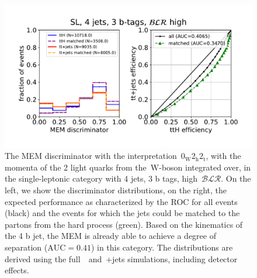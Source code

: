\begin{figure}
\begin{centering}
\includegraphics[width = 1.0\textwidth]{figures/mem_sl_j4_t3_blrH.pdf}
\caption{The MEM discriminator with the interpretation~$0_{\mathrm{W}} 2_{\mathrm{h}} 2_{\mathrm{t}}$, with the momenta of the 2 light quarks from the~$\mathrm{W}$-boson integrated over, in the single-leptonic category with 4 jets, 3 b tags, high~$\mathcal{BLR}$. On the left, we show the discriminator distributions, on the right, the expected performance as characterized by the ROC for all events (black) and the events for which the jets could be matched to the partons from the hard process (green). Based on the kinematics of the 4 b jet, the MEM is already able to achieve a degree of separation ($\mathrm{AUC} = 0.41$) in this category. The distributions are derived using the full~\ttHbb~and~\ttbar+jets simulations, including detector effects.}
\label{fig:mem_sl_j4_t3}
\end{centering}
\end{figure}

